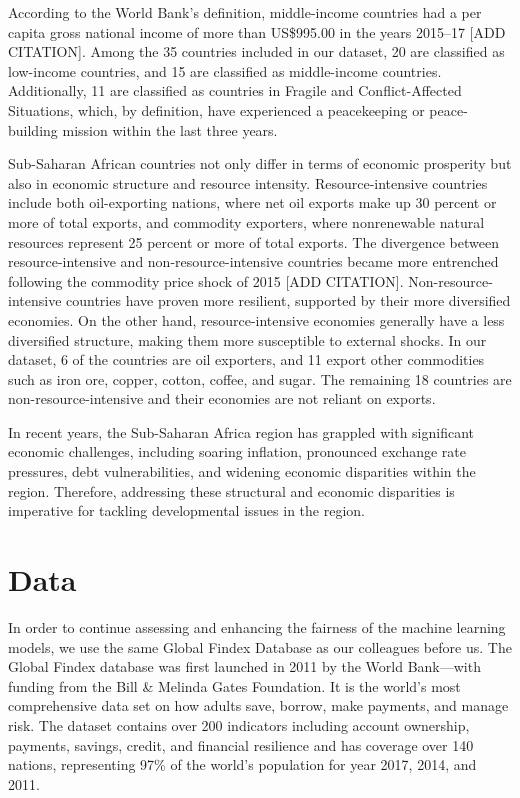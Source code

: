 \documentclass[12pt]{article}
\begin{document}
According to the World Bank's definition, middle-income countries had a
per capita gross national income of more than US\$995.00 in the years
2015--17 {[}ADD CITATION{]}. Among the 35 countries included in our
dataset, 20 are classified as low-income countries, and 15 are
classified as middle-income countries. Additionally, 11 are classified
as countries in Fragile and Conflict-Affected Situations, which, by
definition, have experienced a peacekeeping or peace-building mission
within the last three years.

Sub-Saharan African countries not only differ in terms of economic
prosperity but also in economic structure and resource intensity.
Resource-intensive countries include both oil-exporting nations, where
net oil exports make up 30 percent or more of total exports, and
commodity exporters, where nonrenewable natural resources represent 25
percent or more of total exports. The divergence between
resource-intensive and non-resource-intensive countries became more
entrenched following the commodity price shock of 2015 {[}ADD
CITATION{]}. Non-resource-intensive countries have proven more
resilient, supported by their more diversified economies. On the other
hand, resource-intensive economies generally have a less diversified
structure, making them more susceptible to external shocks. In our
dataset, 6 of the countries are oil exporters, and 11 export other
commodities such as iron ore, copper, cotton, coffee, and sugar. The
remaining 18 countries are non-resource-intensive and their economies
are not reliant on exports.

In recent years, the Sub-Saharan Africa region has grappled with
significant economic challenges, including soaring inflation, pronounced
exchange rate pressures, debt vulnerabilities, and widening economic
disparities within the region. Therefore, addressing these structural
and economic disparities is imperative for tackling developmental issues
in the region.

\hypertarget{data}{%
\section{Data}\label{data}}

In order to continue assessing and enhancing the fairness of the machine
learning models, we use the same Global Findex Database as our
colleagues before us\citep{Porta2022}. The Global Findex database was
first launched in 2011 by the World Bank---with funding from the Bill \&
Melinda Gates Foundation. It is the world's most comprehensive data set
on how adults save, borrow, make payments, and manage risk. The dataset
contains over 200 indicators including account ownership, payments,
savings, credit, and financial resilience and has coverage over 140
nations, representing 97\% of the world's population for year 2017,
2014, and 2011\citep{Demirguc-Kunt2022}.
\end{document}
